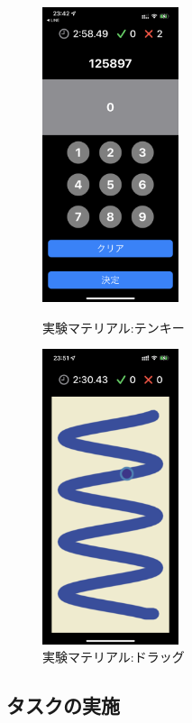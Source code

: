 \begin{figure}[htbp]
  \begin{minipage}{0.5\hsize}
    \begin{center}
       \includegraphics[width=40mm]{img/new1.png}
    \end{center}
    \caption{実験マテリアル:テンキー}
    \label{fig:tenkey}
  \end{minipage}
  \begin{minipage}{0.5\hsize}
    \begin{center}
       \includegraphics[width=40mm]{img/new2.png}
    \end{center}
    \caption{実験マテリアル:ドラッグ}
    \label{fig:drag}
  \end{minipage}
\end{figure}

\subsection{タスクの実施}


